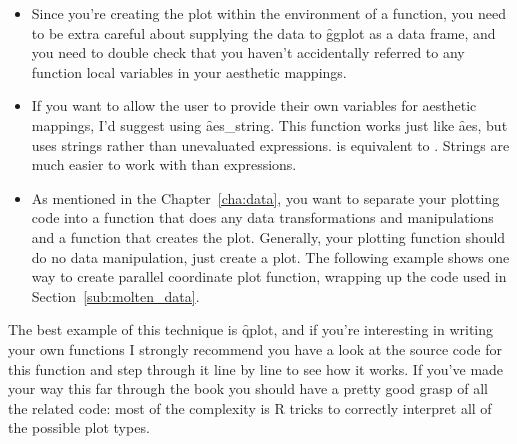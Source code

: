 \begin{itemize}
  \item Since you're creating the plot within the environment of a function, you need to be extra careful about supplying the data to \f{ggplot} as a data frame, and you need to double check that you haven't accidentally referred to any function local variables in your aesthetic mappings.
  
  \item If you want to allow the user to provide their own variables for aesthetic mappings, I'd suggest using \f{aes_string}.  This function works just like \f{aes}, but uses strings rather than unevaluated expressions.  is equivalent to .  Strings are much easier to work with than expressions.

  \item As mentioned in the Chapter~\ref{cha:data}, you want to separate your plotting code into a function that does any data transformations and manipulations and a function that creates the plot. Generally, your plotting function should do no data manipulation, just create a plot. The following example shows one way to create parallel coordinate plot function, wrapping up the code used in Section~\ref{sub:molten_data}.

  
\end{itemize}

The best example of this technique is \f{qplot}, and if you're interesting in writing your own functions I strongly recommend you have a look at the source code for this function and step through it line by line to see how it works.  If you've made your way this far through the book you should have a pretty good grasp of all the \ggplot related code: most of the complexity is R tricks to correctly interpret all of the possible plot types.





